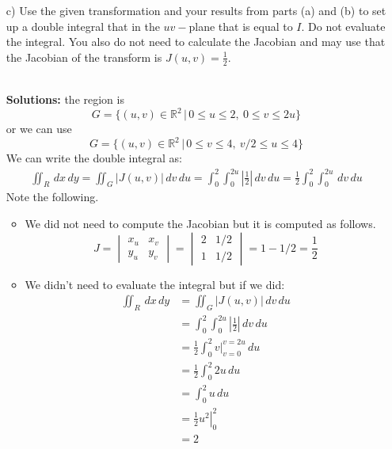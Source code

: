 \begin{enumerate}
        \item[c)] Use the given transformation and your results from parts (a) and (b) to set up a double integral that in the $uv-$plane that is equal to $I$. Do not evaluate the integral. You also do not need to calculate the Jacobian and may use that the Jacobian of the transform is  $J(u,v) = \frac12$. 
            \ifnum {} {\color{DarkBlue} \\[12pt] 
            \textbf{Solutions:} the region is
            $$G = \{ (u,v) \in \mathbb R^2 \, | \, 0\le u \le 2, \ 0 \le v \le 2u\}$$
            or we can use
            $$G = \{ (u,v) \in \mathbb R^2 \, | \, 0\le v \le 4, \ v/2 \le u \le 4\}$$ 
            We can write the double integral as:
            \begin{align}
                \iint_{R} \,dx\,dy
                = \iint_{G}  \left| J(u,v) \right| \,dv\,du 
                = \int_0^2\int_{0}^{2u}  \left| \frac12 \right| \,dv\,du
                = \frac12 \int_0^2\int_{0}^{2u} \,dv\,du
            \end{align}
            Note the following.
            \begin{itemize}
                \item We did not need to compute the Jacobian but it is computed as follows. 
                $$J = \begin{vmatrix} x_u & x_v \\ y_u & y_v \end{vmatrix} = \begin{vmatrix} 2 & 1/2 \\ 1 & 1/2\end{vmatrix} = 1 - 1/2 = \frac12$$
                \item We didn't need to evaluate the integral but if we did: 
                \begin{align}
                \iint_{R} \,dx\,dy
                    &= \iint_{G}  \left| J(u,v) \right| \,dv\,du\\
                    &= \int_0^2\int_{0}^{2u}  \left| \frac12 \right| \,dv\,du\\
                    &= \frac12 \int_0^2\left.  v \right|_{v=0}^{v=2u} \,du\\
                    &= \frac12 \int_0^2 2u \,du\\
                    &=  \int_0^2 u \,du\\
                    &= \frac12 \left. u^2\right|_0^2 \\
                    &= 2
            \end{align}                
            \end{itemize}
            } 
            \else 
            \fi        
    \end{enumerate}
 
